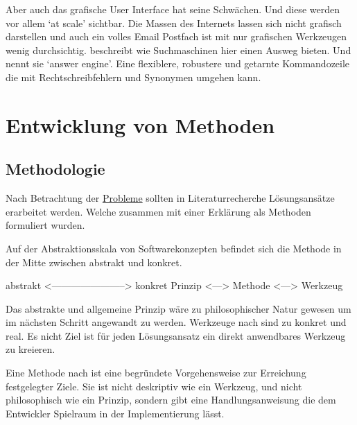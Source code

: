 \documentclass[oneside,bibliography=totocnumbered,BCOR=5mm]{scrbook}
\newenvironment{code}{\captionsetup{type=listing, skip=0pt}}{}
\begin{document}
\smallskip

Aber auch das grafische User Interface hat seine Schwächen. Und diese werden vor
allem `at scale' sichtbar. Die Massen des Internets lassen sich nicht grafisch
darstellen und auch ein volles Email Postfach ist mit nur grafischen Werkzeugen
wenig durchsichtig. \textcite{Norman_2007} beschreibt wie Suchmaschinen hier einen
Ausweg bieten. Und nennt sie `answer engine'. Eine flexiblere, robustere und
getarnte Kommandozeile die mit Rechtschreibfehlern und Synonymen umgehen kann.

\chapter{Entwicklung von Methoden}
\label{sec:methods}

\section{Methodologie}

Nach Betrachtung der \hyperref[sec:cli-problems]{Probleme} sollten in
Literaturrecherche Lösungsansätze erarbeitet werden. Welche zusammen mit einer
Erklärung als Methoden formuliert wurden.

\smallskip

Auf der Abstraktionsskala von Softwarekonzepten befindet sich die Methode in der
Mitte zwischen abstrakt und konkret.

\begin{code}
  \begin{shellcode}
abstrakt <-----------------------> konkret
   Prinzip <---> Methode <---> Werkzeug
  \end{shellcode}
  \medskip
\end{code}

Das abstrakte und allgemeine Prinzip \parencite{Balzert_2009} wäre zu
philosophischer Natur gewesen um im nächsten Schritt angewandt zu werden.
Werkzeuge nach \textcite{Balzert_2009} sind zu konkret und real. Es nicht Ziel ist
für jeden Lösungsansatz ein direkt anwendbares Werkzeug zu kreieren.

\medskip

Eine Methode nach \textcite{Balzert_2009} ist eine begründete Vorgehensweise zur
Erreichung festgelegter Ziele. Sie ist nicht deskriptiv wie ein Werkzeug, und
nicht philosophisch wie ein Prinzip, sondern gibt eine Handlungsanweisung die
dem Entwickler Spielraum in der Implementierung lässt.
\end{document}
